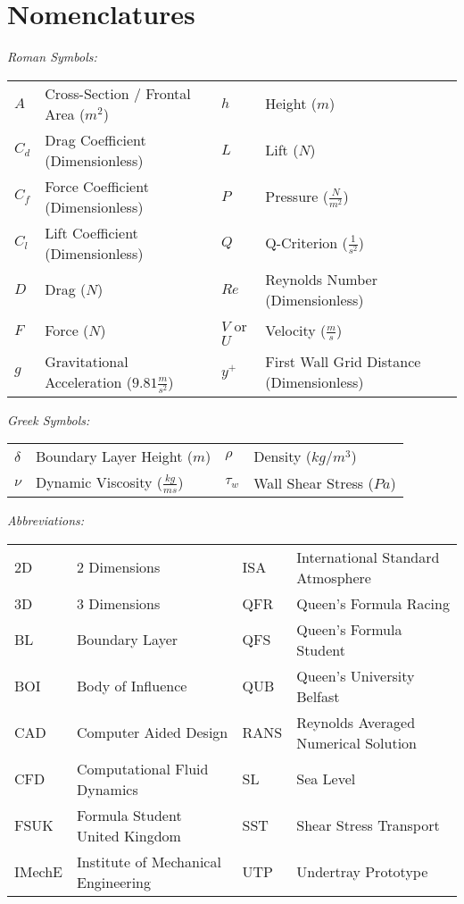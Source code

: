 \newpage
\thispagestyle{empty}
\section*{Nomenclatures} 
\flushleft
\begin{doublespace}

\textit{Roman Symbols:}

\begin{tabular}{l l l l }
$A$ & Cross-Section / Frontal Area ($m^2$) & $h$ & Height ($m$) \\
$C_d$ & Drag Coefficient (Dimensionless) & $L$ & Lift ($N$)\\
$C_f$ & Force Coefficient (Dimensionless)  & $P$ & Pressure ($\frac{N}{m^2}$)\\
$C_l$ & Lift Coefficient (Dimensionless) & $Q$ & Q-Criterion ($\frac{1}{s^2}$) \\
$D$ & Drag ($N$) & $Re$ & Reynolds Number (Dimensionless) \\
$F$ & Force ($N$)  & $V$ or $U$ & Velocity ($\frac{m}{s}$)\\
$g$ & Gravitational Acceleration ($9.81\frac{m}{s^2}$) & $y^+$ & First Wall Grid Distance (Dimensionless) \\
\end{tabular}


\textit{Greek Symbols:}

\begin{tabular}{l l l l }
$\delta$ & Boundary Layer Height ($m$) & $\rho$ & Density ($kg/m^3$) \\
$\nu$ & Dynamic Viscosity ($\frac{kg}{ms}$) & $\tau_w$ & Wall Shear Stress ($Pa$) \\
\end{tabular}

\textit{Abbreviations:}

\begin{tabular}{l l l l }
2D & 2 Dimensions & ISA & International Standard Atmosphere\\
3D & 3 Dimensions & QFR & Queen's Formula Racing\\
BL & Boundary Layer & QFS & Queen's Formula Student\\
BOI & Body of Influence & QUB & Queen's University Belfast\\
CAD & Computer Aided Design & RANS & Reynolds Averaged Numerical Solution\\
CFD & Computational Fluid Dynamics & SL & Sea Level\\
FSUK & Formula Student United Kingdom & SST & Shear Stress Transport\\
IMechE & Institute of Mechanical Engineering  & UTP & Undertray Prototype\\
\end{tabular}

\end{doublespace}